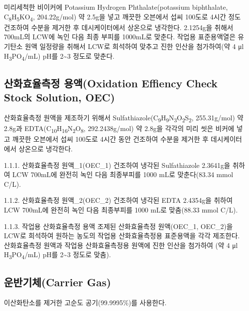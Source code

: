 \documentclass[
]{book}
\begin{document}
미리세척한 비이커에 Potassium Hydrogen Phthalate(potassium biphthalate, C\textsubscript{8}H\textsubscript{5}KO\textsubscript{4}, 204.22g/mol) 약 2.5g을 넣고 깨끗한 오븐에서 섭씨 100도로 4시간 정도 건조하여 수분을 제거한 후 데시케이터에서 상온으로 냉각한다. 2.1254g을 취해서 700mL의 LCW에 녹인 다음 최종 부피를 1000mL로 맞춘다.
작업용 표준용액열은 유기탄소 원액 일정량을 취해서 LCW로 희석하여 맞추고 진한 인산을 첨가하여(약 4 μl H\textsubscript{3}PO\textsubscript{4}/mL) pH를 2\textasciitilde3 정도로 맞춘다.

\hypertarget{uxc0b0uxd654uxd6a8uxc728uxce21uxc815-uxc6a9uxc561oxidation-effiency-check-stock-solution-oec}{%
\subsection{산화효율측정 용액(Oxidation Effiency Check Stock Solution, OEC)}\label{uxc0b0uxd654uxd6a8uxc728uxce21uxc815-uxc6a9uxc561oxidation-effiency-check-stock-solution-oec}}

산화효율측정 원액을 제조하기 위해서 Sulfathiazole(C\textsubscript{9}H\textsubscript{9}N\textsubscript{3}O\textsubscript{2}S\textsubscript{2}, 255.31g/mol) 약 2.8g과 EDTA(C\textsubscript{10}H\textsubscript{16}N\textsubscript{2}O\textsubscript{8}, 292.2438g/mol) 약 2.8g을 각각의 미리 씻은 비커에 넣고 깨끗한 오븐에서 섭씨 100도로 4시간 동안 건조하여 수분을 제거한 후 데시케이터에서 상온으로 냉각한다.

1.1.1. 산화효율측정 원액\_1(OEC\_1)
건조하여 냉각된 Sulfathiazole 2.3641g을 취하여 LCW 700mL에 완전히 녹인 다음 최종부피를 1000 mL로 맞춘다(83.34 mmol C/L).

1.1.2. 산화효율측정 원액\_2(OEC\_2)
건조하여 냉각된 EDTA 2.4354g을 취하여 LCW 700mL에 완전히 녹인 다음 최종부피를 1000 mL로 맞춤(88.33 mmol C/L).

1.1.3. 작업용 산화효율측정 용액
조제된 산화효율측정 원액(OEC\_1, OEC\_2)을 LCW로 희석하여 원하는 농도의 작업용 산화효율측정용 표준용액을 각각 제조한다. 산화효율측정 원액과 작업용 산화효율측정용 원액에 진한 인산을 첨가하여 (약 4 μl H\textsubscript{3}PO\textsubscript{4}/mL) pH를 2\textasciitilde3 정도로 맞춤).

\hypertarget{uxc6b4uxbc18uxae30uxccb4carrier-gas}{%
\subsection{운반기체(Carrier Gas)}\label{uxc6b4uxbc18uxae30uxccb4carrier-gas}}

이산화탄소를 제거한 고순도 공기(99.9995\%)를 사용한다.
\end{document}
